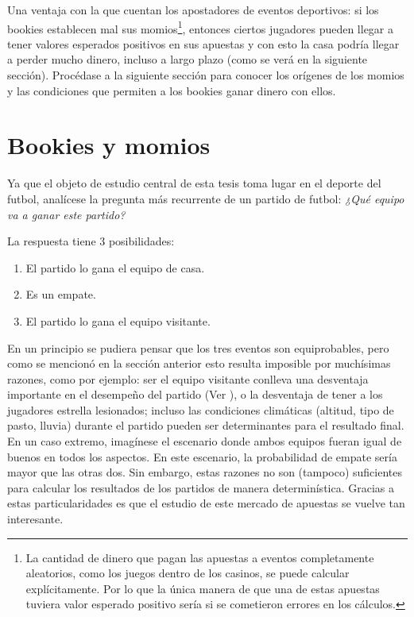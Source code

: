  Una ventaja con la que cuentan los apostadores de eventos deportivos: si los bookies establecen mal sus momios\footnote{La cantidad de dinero que pagan las apuestas a eventos completamente aleatorios, como los juegos dentro de los casinos, se puede calcular explícitamente. Por lo que la única manera de que una de estas apuestas tuviera valor esperado positivo sería si se cometieron errores en los cálculos.}, entonces ciertos jugadores pueden llegar a tener valores esperados positivos en sus apuestas y con esto la casa podría llegar a perder mucho dinero, incluso a largo plazo (como se verá en la siguiente sección). Procédase a la siguiente sección para conocer los orígenes de los momios y las condiciones que permiten a los bookies ganar dinero con ellos.
 
 \section{Bookies y momios}
Ya que el objeto de estudio central de esta tesis toma lugar en el deporte del futbol, analícese la pregunta más recurrente de un partido de futbol: \emph{¿Qué equipo va a ganar este partido?}

La respuesta tiene $3$ posibilidades:
 \begin{enumerate}
  \item El partido lo gana el equipo de casa.
  \item Es un empate.
  \item El partido lo gana el equipo visitante.
 \end{enumerate}
 
En un principio se pudiera pensar que los tres eventos son equiprobables, pero como se mencionó en la sección anterior esto resulta imposible por muchísimas razones, como por ejemplo: ser el equipo visitante conlleva una desventaja importante en el desempeño del partido (Ver \cite{roffe2007crisis}), o la desventaja de tener a los jugadores estrella lesionados; incluso las condiciones climáticas (altitud, tipo de pasto, lluvia) durante el partido pueden ser determinantes para el resultado final. En un caso extremo, imagínese el escenario donde ambos equipos fueran igual de buenos en todos los aspectos. En este escenario, la probabilidad de empate sería mayor que las otras dos. Sin embargo, estas razones no son (tampoco) suficientes para calcular los resultados de los partidos de manera determinística. Gracias a estas particularidades es que el estudio de este mercado de apuestas se vuelve tan interesante.

